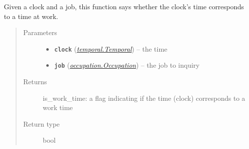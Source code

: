 \documentclass[letterpaper,10pt,english]{sphinxmanual}
\begin{document}
\begin{fulllineitems}
\label{occupation:occupation.is_work_time_help}
Given a clock and a job, this function says whether the clock's time corresponds to
a time at work.
\begin{quote}\begin{description}
\item[{Parameters}] \leavevmode\begin{itemize}
\item {} 
\textbf{\texttt{clock}} ({\hyperref[temporal:temporal.Temporal]{\emph{\emph{temporal.Temporal}}}}) -- the time

\item {} 
\textbf{\texttt{job}} ({\hyperref[occupation:occupation.Occupation]{\emph{\emph{occupation.Occupation}}}}) -- the job to inquiry

\end{itemize}

\item[{Returns}] \leavevmode
is\_work\_time: a flag indicating if the time (clock) corresponds to a work time

\item[{Return type}] \leavevmode
bool

\end{description}\end{quote}

\end{fulllineitems}

\end{document}
